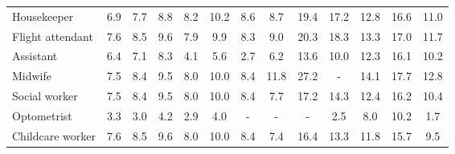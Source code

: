 \begin{table*}[p]
{\begin{tabular}{l|ccc|ccc|ccc|ccc}
\\
Housekeeper
& \cellcolor{orange3} 6.9 & \cellcolor{orange3} 7.7 & \cellcolor{orange3} 8.8
& \cellcolor{orange3} 8.2 & \cellcolor{orange4} 10.2 & \cellcolor{orange3} 8.6
& \cellcolor{orange3} 8.7 & \cellcolor{orange7} 19.4 & \cellcolor{orange7} 17.2
& \cellcolor{orange5} 12.8 & \cellcolor{orange6} 16.6 & \cellcolor{orange4} 11.0
\\
Flight attendant
& \cellcolor{orange3} 7.6 & \cellcolor{orange3} 8.5 & \cellcolor{orange4} 9.6
& \cellcolor{orange3} 7.9 & \cellcolor{orange4} 9.9 & \cellcolor{orange3} 8.3
& \cellcolor{orange3} 9.0 & \cellcolor{orange8} 20.3 & \cellcolor{orange7} 18.3
& \cellcolor{orange5} 13.3 & \cellcolor{orange6} 17.0 & \cellcolor{orange4} 11.7
\\
Assistant
& \cellcolor{orange2} 6.4 & \cellcolor{orange3} 7.1 & \cellcolor{orange3} 8.3
& \cellcolor{orange2} 4.1 & \cellcolor{orange2} 5.6 & \cellcolor{orange1} 2.7
& \cellcolor{orange2} 6.2 & \cellcolor{orange5} 13.6 & \cellcolor{orange4} 10.0
& \cellcolor{orange5} 12.3 & \cellcolor{orange6} 16.1 & \cellcolor{orange4} 10.2
\\
Midwife
& \cellcolor{orange3} 7.5 & \cellcolor{orange3} 8.4 & \cellcolor{orange4} 9.5
& \cellcolor{orange3} 8.0 & \cellcolor{orange4} 10.0 & \cellcolor{orange3} 8.4
& \cellcolor{orange4} 11.8 & \cellcolor{orange10} 27.2 & \cellcolor{lightgray} -
& \cellcolor{orange5} 14.1 & \cellcolor{orange7} 17.7 & \cellcolor{orange5} 12.8
\\
Social worker
& \cellcolor{orange3} 7.5 & \cellcolor{orange3} 8.4 & \cellcolor{orange4} 9.5
& \cellcolor{orange3} 8.0 & \cellcolor{orange4} 10.0 & \cellcolor{orange3} 8.4
& \cellcolor{orange3} 7.7 & \cellcolor{orange7} 17.2 & \cellcolor{orange5} 14.3
& \cellcolor{orange5} 12.4 & \cellcolor{orange6} 16.2 & \cellcolor{orange4} 10.4
\\
Optometrist
& \cellcolor{orange1} 3.3 & \cellcolor{orange1} 3.0 & \cellcolor{orange2} 4.2
& \cellcolor{orange1} 2.9 & \cellcolor{orange2} 4.0 & \cellcolor{lightgray} -
& \cellcolor{lightgray} - & \cellcolor{lightgray} - & \cellcolor{blue1} 2.5
& \cellcolor{orange3} 8.0 & \cellcolor{orange4} 10.2 & \cellcolor{orange1} 1.7
\\
Childcare worker
& \cellcolor{orange3} 7.6 & \cellcolor{orange3} 8.5 & \cellcolor{orange4} 9.6
& \cellcolor{orange3} 8.0 & \cellcolor{orange4} 10.0 & \cellcolor{orange3} 8.4
& \cellcolor{orange3} 7.4 & \cellcolor{orange6} 16.4 & \cellcolor{orange5} 13.3
& \cellcolor{orange4} 11.8 & \cellcolor{orange6} 15.7 & \cellcolor{orange4} 9.5

\end{tabular}}
\end{table*}
